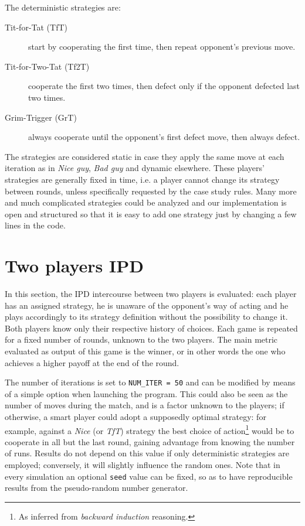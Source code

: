 \documentclass[journal,10pt,twoside]{IEEEtran}
\begin{document}
The deterministic strategies are:
\begin{description}
    \item[Tit-for-Tat (TfT)] start by cooperating the first time, then repeat opponent's previous move.
    \item[Tit-for-Two-Tat (Tf2T)] cooperate the first two times, then defect only if the opponent defected last two times.
    \item[Grim-Trigger (GrT)] always cooperate until the opponent's first defect move, then always defect. 
\end{description}

The strategies are considered static in case they apply the same move at each iteration as in \textit{Nice guy}, \textit{Bad guy} and dynamic elsewhere.
These players' strategies are generally fixed in time, i.e. a player cannot change its strategy between rounds, unless specifically requested by the case study rules.
Many more and much complicated strategies could be analyzed and our implementation is open and structured so that it is easy to add one strategy just by changing a few lines in the code.

\section{Two players IPD} \label{s:IPD2P}
In this section, the IPD intercourse between two players is evaluated: each player has an assigned strategy, he is unaware of the opponent's way of acting and he plays accordingly to its strategy definition without the possibility to change it. Both players know only their respective history of choices. Each game is repeated for a fixed number of rounds, unknown to the two players. The main metric evaluated as output of this game is the winner, or in other words the one who achieves a higher payoff at the end of the round.

The number of iterations is set to \texttt{NUM\_ITER = 50} and can be modified by means of a simple option when launching the program.
This could also be seen as the number of moves during the match, and is a factor unknown to the players; if otherwise, a smart player could adopt a supposedly optimal strategy: for example, against a \textit{Nice} (or \textit{TfT}) strategy the best choice of action\footnote{As inferred from \textit{backward induction} reasoning.} would be to cooperate in all but the last round, gaining advantage from knowing the number of runs.
Results do not depend on this value if only deterministic strategies are employed; conversely, it will slightly influence the random ones.
Note that in every simulation an optional \texttt{seed} value can be fixed, so as to have reproducible results from the pseudo-random number generator.
\end{document}

